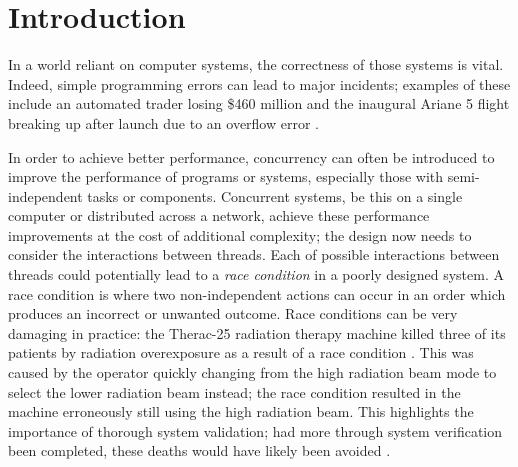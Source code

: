 \section{Introduction}


In a world reliant on computer systems, the correctness of those systems is vital. Indeed, simple programming errors can lead to major incidents; examples of these include an automated trader losing \$460 million \cite{KnightCapital} and the inaugural Ariane 5 flight breaking up after launch due to an overflow error \cite{Flight501Failure}. 

In order to achieve better performance, concurrency can often be introduced to improve the performance of programs or systems, especially those with semi-independent tasks or components.
Concurrent systems, be this on a single computer or distributed across a network, achieve these performance improvements at the cost of additional complexity; the design now needs to consider the interactions between threads. 
Each of possible interactions between threads could potentially lead to a \emph{race condition} in a poorly designed system. A race condition is where two non-independent actions can occur in an order which produces an incorrect or unwanted outcome. 
Race conditions can be very damaging in practice: the Therac-25 radiation therapy machine killed three of its patients by radiation overexposure as a result of a race condition \cite{BugSnag}. This was caused by the operator quickly changing from the high radiation beam mode to select the lower radiation beam instead; the race condition resulted in the machine erroneously still using the high radiation beam. This highlights the importance of thorough system validation; had more through system verification been completed, these deaths would have likely been avoided \cite{AGift}.



